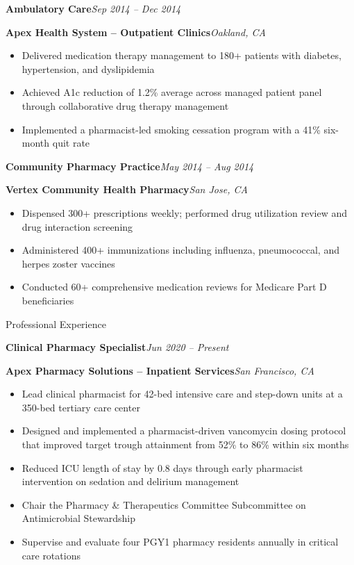 \documentclass[11pt,letterpaper]{article}
\newcommand{\entryheader}[4]{%
  \textbf{#1}\hfill\textit{#2}\par
  \textbf{#3}\hfill\textit{#4}\par\vspace{2pt}%
}
\newcommand{\rotationentry}[4]{%
  \textbf{#1}\hfill\textit{#2}\par
  \textbf{#3}\hfill\textit{#4}\par\vspace{2pt}%
}
\begin{document}
\rotationentry{Ambulatory Care}{Sep 2014 -- Dec 2014}{Apex Health System -- Outpatient Clinics}{Oakland, CA}
\begin{itemize}
  \item Delivered medication therapy management to 180+ patients with diabetes, hypertension, and dyslipidemia
  \item Achieved A1c reduction of 1.2\% average across managed patient panel through collaborative drug therapy management
  \item Implemented a pharmacist-led smoking cessation program with a 41\% six-month quit rate
\end{itemize}

\rotationentry{Community Pharmacy Practice}{May 2014 -- Aug 2014}{Vertex Community Health Pharmacy}{San Jose, CA}
\begin{itemize}
  \item Dispensed 300+ prescriptions weekly; performed drug utilization review and drug interaction screening
  \item Administered 400+ immunizations including influenza, pneumococcal, and herpes zoster vaccines
  \item Conducted 60+ comprehensive medication reviews for Medicare Part D beneficiaries
\end{itemize}

\begin{sectionbox}
  Professional Experience
\end{sectionbox}

\entryheader{Clinical Pharmacy Specialist}{Jun 2020 -- Present}{Apex Pharmacy Solutions -- Inpatient Services}{San Francisco, CA}
\begin{itemize}
  \item Lead clinical pharmacist for 42-bed intensive care and step-down units at a 350-bed tertiary care center
  \item Designed and implemented a pharmacist-driven vancomycin dosing protocol that improved target trough attainment from 52\% to 86\% within six months
  \item Reduced ICU length of stay by 0.8 days through early pharmacist intervention on sedation and delirium management
  \item Chair the Pharmacy \& Therapeutics Committee Subcommittee on Antimicrobial Stewardship
  \item Supervise and evaluate four PGY1 pharmacy residents annually in critical care rotations
\end{itemize}
\end{document}
